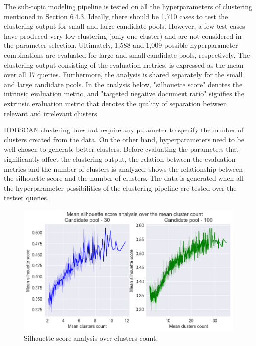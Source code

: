 The sub-topic modeling pipeline is tested on all the hyperparameters of clustering mentioned in Section 6.4.3. Ideally, there should be 1,710 cases to test the clustering output for small and large candidate pools. However, a few test cases have produced very low clustering (only one cluster) and are not considered in the parameter selection. Ultimately, 1,588 and 1,009 possible hyperparameter combinations are evaluated for large and small candidate pools, respectively. The clustering output consisting of the evaluation metrics, is expressed as the mean over all 17 queries. Furthermore, the analysis is shared separately for the small and large candidate pools. In the analysis below, "silhouette score" denotes the intrinsic evaluation metric, and "targeted negative document ratio" signifies the extrinsic evaluation metric that denotes the quality of separation between relevant and irrelevant clusters.

\ac{HDBSCAN} clustering does not require any parameter to specify the number of clusters created from the data. On the other hand,  hyperparameters need to be well chosen to generate better clusters. Before evaluating the parameters that significantly affect the clustering output, the relation between the evaluation metrics and the number of clusters is analyzed.   shows the relationship between the silhouette score and the number of clusters. The data is generated when all the hyperparameter possibilities of the clustering pipeline are tested over the testset queries.

\begin{figure}[h]
	\centering
	\includegraphics[width=.99\textwidth]{images/subplots/sil_score_ccnt_subplot.png}
	\caption{Silhouette score analysis over clusters count. \label{fig:silhouette_score_vs_cc}}
\end{figure}

